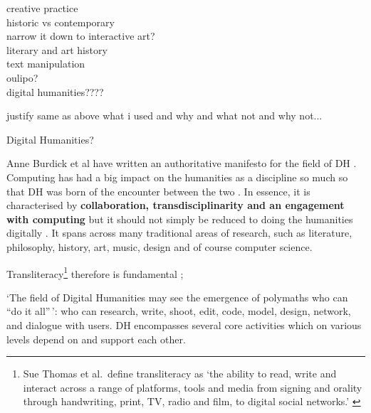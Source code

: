 \begin{draft}
  creative practice\\
  historic vs contemporary\\
  narrow it down to interactive art?\\
  literary and art history\\
  text manipulation\\
  oulipo?\\
  digital humanities????

  justify same as above what i used and why and what not and why not...
\end{draft}

Digital Humanities?

\begin{draft}
  Anne Burdick et al have written an authoritative manifesto for the field of \ac{DH} \citeyear{Burdick2012}. Computing has had a big impact on the humanities as a discipline so much so that \ac{DH} was born of the encounter between the two \autocite[p.3]{Burdick2012}. In essence, it is characterised by \textbf{collaboration, transdisciplinarity and an engagement with computing} \autocite[p.122]{Burdick2012} but it should not simply be reduced to doing the humanities digitally \autocite[p.101]{Burdick2012}. It spans across many traditional areas of research, such as literature, philosophy, history, art, music, design and of course computer science.

  \begin{draft}
    Transliteracy\footnote{Sue Thomas et al.\ define transliteracy as `the ability to read, write and interact across a range of platforms, tools and media from signing and orality through handwriting, print, TV, radio and film, to digital social networks.' \autocite{Thomas2007}} therefore is fundamental \autocite{Thomas2007};
  \end{draft}

  `The field of Digital Humanities may see the emergence of polymaths who can ``do it all''\,': who can research, write, shoot, edit, code, model, design, network, and dialogue with users. \autocite[p.15]{Burdick2012} \ac{DH} encompasses several core activities which on various levels depend on and support each other.


\end{draft}
